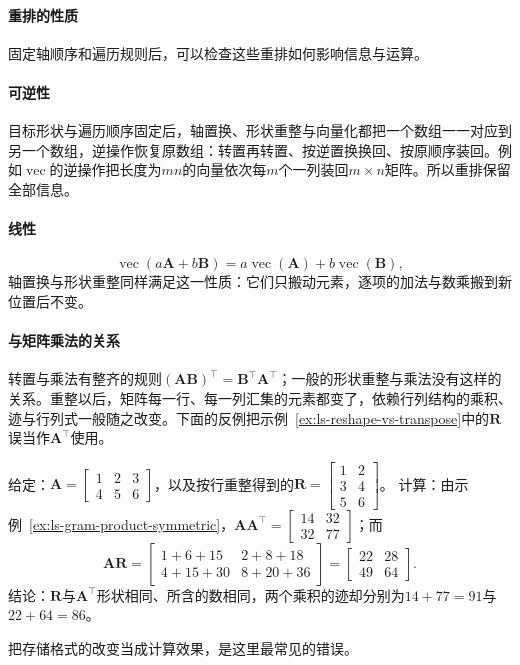 \paragraph{重排的性质}

固定轴顺序和遍历规则后，可以检查这些重排如何影响信息与运算。

\paragraph{可逆性}
目标形状与遍历顺序固定后，轴置换、形状重整与向量化都把一个数组一一对应到另一个数组，逆操作恢复原数组：转置再转置、按逆置换换回、按原顺序装回。例如$\operatorname{vec}$的逆操作把长度为$mn$的向量依次每$m$个一列装回$m\times n$矩阵。所以重排保留全部信息。

\paragraph{线性}
\[
 \operatorname{vec}(a\bm A+b\bm B)=a\operatorname{vec}(\bm A)+b\operatorname{vec}(\bm B),
\]
轴置换与形状重整同样满足这一性质：它们只搬动元素，逐项的加法与数乘搬到新位置后不变。

\paragraph{与矩阵乘法的关系}
转置与乘法有整齐的规则$(\bm A\bm B)^\top=\bm B^\top\bm A^\top$；一般的形状重整与乘法没有这样的关系。重整以后，矩阵每一行、每一列汇集的元素都变了，依赖行列结构的乘积、迹与行列式一般随之改变。下面的反例把示例~\ref{ex:ls-reshape-vs-transpose}中的$\bm R$误当作$\bm A^\top$使用。
\begin{example}[反例：重整不能代替转置]
\label{ex:ls-reshape-breaks-product}
给定：$\bm A=\left[\begin{smallmatrix}1&2&3\\4&5&6\end{smallmatrix}\right]$，以及按行重整得到的$\bm R=\left[\begin{smallmatrix}1&2\\3&4\\5&6\end{smallmatrix}\right]$。
计算：由示例~\ref{ex:ls-gram-product-symmetric}，$\bm A\bm A^\top=\left[\begin{smallmatrix}14&32\\32&77\end{smallmatrix}\right]$；而
\[
 \bm A\bm R=\begin{bmatrix}1+6+15&2+8+18\\4+15+30&8+20+36\end{bmatrix}=\begin{bmatrix}22&28\\49&64\end{bmatrix}.
\]
结论：$\bm R$与$\bm A^\top$形状相同、所含的数相同，两个乘积的迹却分别为$14+77=91$与$22+64=86$。
\end{example}
把存储格式的改变当成计算效果，是这里最常见的错误。


